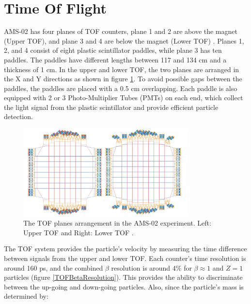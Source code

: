 \section{Time Of Flight}

AMS-02 has four planes of TOF counters, plane 1 and 2 are above the magnet (Upper TOF), and plane 3 and 4 are below the magnet (Lower TOF) \cite{AMSTOFPaper1, AMSTOFPaper2}. Planes 1, 2, and 4 consist of eight plastic scintillator paddles, while plane 3 has ten paddles. The paddles have different lengths between 117 and 134 cm and a thickness of 1 cm. In the upper and lower TOF, the two planes are arranged in the X and Y directions as shown in figure \ref{TOFArrangement}. To avoid possible gaps between the paddles, the paddles are placed with a 0.5 cm overlapping. Each paddle is also equipped with 2 or 3 Photo-Multiplier Tubes (PMTs) on each end, which collect the light signal from the plastic scintillator and provide efficient particle detection.  \par
 
\begin{figure}[h]
\centering
\includegraphics[width=0.8\textwidth, height=0.36\textheight ]{Figures/chapter3/TOF/Arrangement.png}
\caption[The TOF planes arrangement in the AMS-02 experiment.]{The TOF planes arrangement in the AMS-02 experiment. Left: Upper TOF and Right: Lower TOF \cite{TOFdetector}. }
\label{TOFArrangement}
\end{figure}


The TOF system provides the particle's velocity by measuring the time difference between signals from the upper and lower TOF. Each counter's time resolution is around 160 ps, and the combined $\beta$ resolution is around $4 \%$ for $\beta \approx 1$ and $Z=1$ particles (figure \ref{TOFBetaResolution}). This provides the ability to discriminate between the up-going and down-going particles. Also, since the particle's mass is determined by: 

